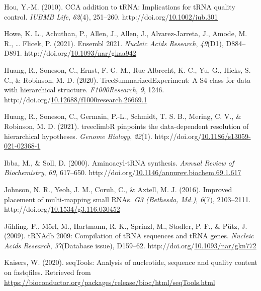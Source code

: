 \documentclass[12pt,twoside]{reedthesis}
\newlength{\cslhangindent}
\newenvironment{CSLReferences}[2] %
 {%
  \setlength{\parindent}{0pt}
  \ifodd #1 \everypar{\setlength{\hangindent}{\cslhangindent}}\ignorespaces\fi
  \ifnum #2 > 0
  \setlength{\parskip}{#2\baselineskip}
  \fi
 }%
 {}
\begin{document}
\begin{CSLReferences}{1}{0}
\leavevmode{}%
Hou, Y.-M. (2010). CCA addition to tRNA: Implications for tRNA quality control. \emph{IUBMB Life}, \emph{62}(4), 251--260. http://doi.org/\href{https://doi.org/10.1002/iub.301}{10.1002/iub.301}

\leavevmode{}%
Howe, K. L., Achuthan, P., Allen, J., Allen, J., Alvarez-Jarreta, J., Amode, M. R., \ldots{} Flicek, P. (2021). Ensembl 2021. \emph{Nucleic Acids Research}, \emph{49}(D1), D884--D891. http://doi.org/\href{https://doi.org/10.1093/nar/gkaa942}{10.1093/nar/gkaa942}

\leavevmode{}%
Huang, R., Soneson, C., Ernst, F. G. M., Rue-Albrecht, K. C., Yu, G., Hicks, S. C., \& Robinson, M. D. (2020). TreeSummarizedExperiment: A S4 class for data with hierarchical structure. \emph{F1000Research}, \emph{9}, 1246. http://doi.org/\href{https://doi.org/10.12688/f1000research.26669.1}{10.12688/f1000research.26669.1}

\leavevmode{}%
Huang, R., Soneson, C., Germain, P.-L., Schmidt, T. S. B., Mering, C. V., \& Robinson, M. D. (2021). treeclimbR pinpoints the data-dependent resolution of hierarchical hypotheses. \emph{Genome Biology}, \emph{22}(1). http://doi.org/\href{https://doi.org/10.1186/s13059-021-02368-1}{10.1186/s13059-021-02368-1}

\leavevmode{}%
Ibba, M., \& Soll, D. (2000). Aminoacyl-tRNA synthesis. \emph{Annual Review of Biochemistry}, \emph{69}, 617--650. http://doi.org/\href{https://doi.org/10.1146/annurev.biochem.69.1.617}{10.1146/annurev.biochem.69.1.617}

\leavevmode{}%
Johnson, N. R., Yeoh, J. M., Coruh, C., \& Axtell, M. J. (2016). Improved placement of multi-mapping small RNAs. \emph{G3 (Bethesda, Md.)}, \emph{6}(7), 2103--2111. http://doi.org/\href{https://doi.org/10.1534/g3.116.030452}{10.1534/g3.116.030452}

\leavevmode{}%
Jühling, F., Mörl, M., Hartmann, R. K., Sprinzl, M., Stadler, P. F., \& Pütz, J. (2009). tRNAdb 2009: Compilation of tRNA sequences and tRNA genes. \emph{Nucleic Acids Research}, \emph{37}(Database issue), D159--62. http://doi.org/\href{https://doi.org/10.1093/nar/gkn772}{10.1093/nar/gkn772}

\leavevmode{}%
Kaisers, W. (2020). seqTools: Analysis of nucleotide, sequence and quality content on fastqfiles. Retrieved from \url{https://bioconductor.org/packages/release/bioc/html/seqTools.html}


\end{CSLReferences}
\end{document}
